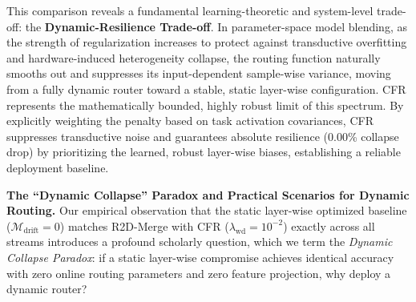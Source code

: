 This comparison reveals a fundamental learning-theoretic and system-level trade-off: the \textbf{Dynamic-Resilience Trade-off}. In parameter-space model blending, as the strength of regularization increases to protect against transductive overfitting and hardware-induced heterogeneity collapse, the routing function naturally smooths out and suppresses its input-dependent sample-wise variance, moving from a fully dynamic router toward a stable, static layer-wise configuration. CFR represents the mathematically bounded, highly robust limit of this spectrum. By explicitly weighting the penalty based on task activation covariances, CFR suppresses transductive noise and guarantees absolute resilience (0.00\% collapse drop) by prioritizing the learned, robust layer-wise biases, establishing a reliable deployment baseline.

\textbf{The ``Dynamic Collapse'' Paradox and Practical Scenarios for Dynamic Routing.}
Our empirical observation that the static layer-wise optimized baseline ($\mathcal{M}_{\text{drift}} = 0$) matches R2D-Merge with CFR ($\lambda_{\text{wd}} = 10^{-2}$) exactly across all streams introduces a profound scholarly question, which we term the \emph{Dynamic Collapse Paradox}: if a static layer-wise compromise achieves identical accuracy with zero online routing parameters and zero feature projection, why deploy a dynamic router?


